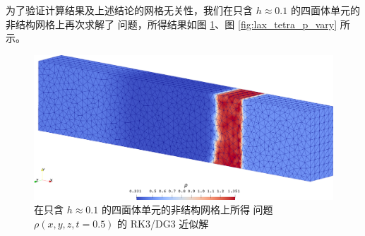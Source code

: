 为了验证计算结果及上述结论的网格无关性，我们在只含 $h\approx0.1$ 的四面体单元的非结构网格上再次求解了 问题，所得结果如图
\ref{fig:lax_tetra}、图 \ref{fig:lax_tetra_p_vary} 所示。

\begin{figure}[h!]
\begin{centering}
\includegraphics[width=1\textwidth]{../mdpi/figures/shock_tubes/lax/contour_tetra}
\par\end{centering}
\caption{\label{fig:lax_tetra}在只含 $h\approx0.1$ 的四面体单元的非结构网格上所得 问题
$\rho(x,y,z,t=0.5)$ 的 RK3/DG3 近似解}
\end{figure}

